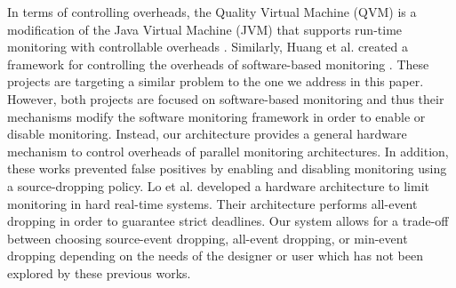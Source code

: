 In terms of controlling overheads, the Quality Virtual Machine (QVM) is a
modification of the Java Virtual Machine (JVM) that supports run-time
monitoring with controllable overheads \cite{qvm-oopsla08}. Similarly, Huang et
al. created a framework for controlling the overheads of software-based
monitoring \cite{huang-sttt12}. These projects are targeting a similar problem
to the one we address in this paper. However, both projects are focused on
software-based monitoring and thus their mechanisms modify the software
monitoring framework in order to enable or disable monitoring. Instead, our
architecture provides a general hardware mechanism to control overheads of
parallel monitoring architectures. In addition, these works prevented
false positives by enabling and disabling monitoring using a source-dropping
policy. Lo et al. \cite{lo-rtas14} developed a hardware architecture to limit
monitoring in hard real-time systems. Their architecture performs all-event 
dropping in order to guarantee strict deadlines. Our system allows for a
trade-off between choosing source-event dropping, all-event dropping, or min-event
dropping depending on the needs of the designer or user which has not been
explored by these previous works. 
